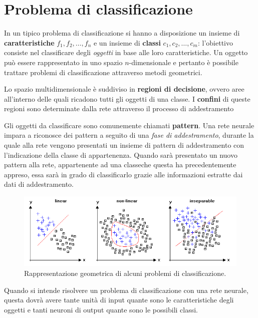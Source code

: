 
\chapter{Problema di classificazione}
\label{cha:problema_di_classificazione}

In un tipico problema di classificazione si hanno a disposizione un insieme di \textbf{caratteristiche} $f_1, f_2, \dots,f_n$ e un insieme di \textbf{classi} $c_1, c_2, \dots, c_m$: l'obiettivo consiste nel classificare degli \emph{oggetti} in base alle loro caratteristiche. Un oggetto può essere rappresentato in uno spazio $n$-dimensionale e pertanto è possibile trattare problemi di classificazione attraverso metodi geometrici.

Lo spazio multidimensionale è suddiviso in \textbf{regioni di decisione}, ovvero aree all'interno delle quali ricadono tutti gli oggetti di una classe. I \textbf{confini} di queste regioni sono determinate dalla rete attraverso il processo di addestramento

Gli oggetti da classificare sono comunemente chiamati \textbf{pattern}. Una rete neurale impara a riconosce dei pattern a seguito di una \emph{fase di addestramento}, durante la quale alla rete vengono presentati un insieme di pattern di addestramento con l'indicazione della classe di appartenenza. Quando sarà presentato un nuovo pattern alla rete, appartenente ad una classeche questa ha precedentemente appreso, essa sarà in grado di classificarlo grazie alle informazioni estratte dai dati di addestramento.
\begin{figure}[h!]
	\centering
	\includegraphics[width=\textwidth]{images/classify.png}
	\caption[Separabilità lineare nella classificazione.]{Rappresentazione geometrica di alcuni problemi di classificazione.}
\end{figure}

\noindent Quando si intende risolvere un problema di classificazione con una rete neurale, questa dovrà avere tante unità di input quante sono le caratteristiche degli oggetti e tanti neuroni di output quante sono le possibili classi.

